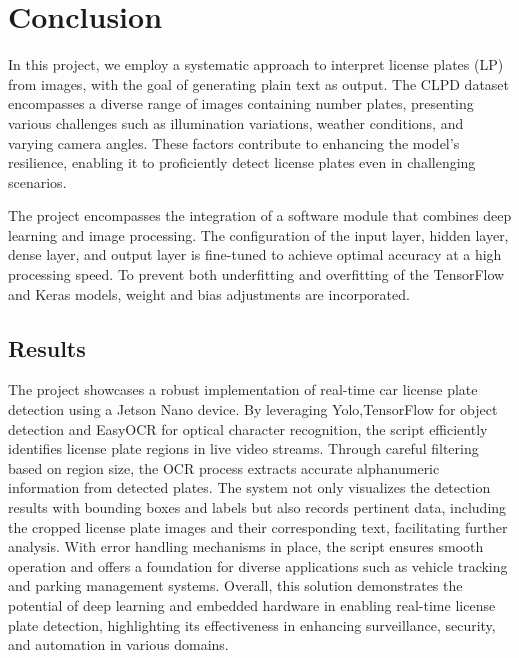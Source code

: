 %
%


\chapter{Conclusion}

In this project, we employ a systematic approach to interpret license plates (LP) from images, with the goal of generating plain text as output. The CLPD dataset encompasses a diverse range of images containing number plates, presenting various challenges such as illumination variations, weather conditions, and varying camera angles. These factors contribute to enhancing the model's resilience, enabling it to proficiently detect license plates even in challenging scenarios.

The project encompasses the integration of a software module that combines deep learning and image processing. The configuration of the input layer, hidden layer, dense layer, and output layer is fine-tuned to achieve optimal accuracy at a high processing speed. To prevent both underfitting and overfitting of the TensorFlow and Keras models, weight and bias adjustments are incorporated.

\section{Results}

The  project showcases a robust implementation of real-time car license plate detection using a Jetson Nano device. By leveraging Yolo,TensorFlow for object detection and EasyOCR for optical character recognition, the script efficiently identifies license plate regions in live video streams. Through careful filtering based on region size, the OCR process extracts accurate alphanumeric information from detected plates. The system not only visualizes the detection results with bounding boxes and labels but also records pertinent data, including the cropped license plate images and their corresponding text, facilitating further analysis. With error handling mechanisms in place, the script ensures smooth operation and offers a foundation for diverse applications such as vehicle tracking and parking management systems. Overall, this solution demonstrates the potential of deep learning and embedded hardware in enabling real-time license plate detection, highlighting its effectiveness in enhancing surveillance, security, and automation in various domains.

